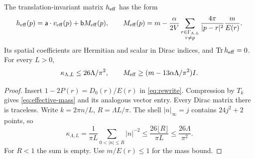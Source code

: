 \begin{lemma}\label{lem:mass}
The translation-invariant matrix $h_{\mathrm{eff}}$ has the form
\begin{equation}
h_{\mathrm{eff}}(p)=\mathsf a\cdot v_{\rm eff}(p)+\mathsf b M_{\rm eff}(p),\qquad
M_{\rm eff}(p)=m-\frac{\alpha}{2V}
\sum_{\substack{r\in\Gamma_{\Lambda,L}\\r\ne p}}
\frac{4\pi}{|p-r|^2}\frac{m}{E(r)}.
\label{eq:effective-mass}
\end{equation}
Its spatial coefficients are Hermitian and scalar in Dirac indices,
and $\operatorname{Tr}h_{\mathrm{eff}}=0$. For every $L>0$,
\begin{equation}
\kappa_{\Lambda,L}\le26\Lambda/\pi^2,\qquad
M_{\rm eff}\ge(m-13\alpha\Lambda/\pi^2)I.
\label{eq:kappa}
\end{equation}
\end{lemma}
\begin{proof}
Insert $1-2P(r)=D_0(r)/E(r)$ in \eqref{eq:rewrite}.
Compression by $T_k$ gives \eqref{eq:effective-mass} and its analogous
vector entry. Every Dirac matrix there is traceless.
Write $k=2\pi n/L$, $R=\Lambda L/\pi$.
The shell $|n|_\infty=j$ contains $24j^2+2$ points, so
\[
\kappa_{\Lambda,L}
=\frac1{\pi L}\sum_{0<|n|\le R}|n|^{-2}
\le\frac{26\lfloor R\rfloor}{\pi L}\le\frac{26\Lambda}{\pi^2}.
\]
For $R<1$ the sum is empty. Use $m/E(r)\le1$ for the mass bound.
\end{proof}

